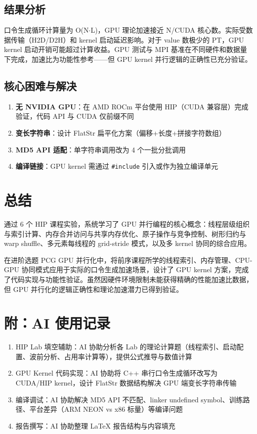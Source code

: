 \documentclass[12pt,a4paper]{article}
\begin{document}
\subsection{结果分析}
口令生成循环计算量为 O(N$\cdot$L)，GPU 理论加速接近 N/CUDA 核心数。实际受数据传输（H2D/D2H）和 kernel 启动延迟影响。对于 value 数极少的 PT，GPU kernel 启动开销可能超过计算收益。GPU 测试与 MPI 基准在不同硬件和数据量下完成，加速比为功能性参考——但 GPU kernel 并行逻辑的正确性已充分验证。

\subsection{核心困难与解决}
\begin{enumerate}[leftmargin=*]
    \item \textbf{无 NVIDIA GPU}：在 AMD ROCm 平台使用 HIP（CUDA 兼容层）完成验证，代码 API 与 CUDA 仅前缀不同
    \item \textbf{变长字符串}：设计 FlatStr 扁平化方案（偏移+长度+拼接字符数组）
    \item \textbf{MD5 API 适配}：单字符串调用改为 4 个一批分批调用
    \item \textbf{编译链接}：GPU kernel 需通过 \texttt{\#include} 引入或作为独立编译单元
\end{enumerate}

\section{总结}

通过 6 个 HIP 课程实验，系统学习了 GPU 并行编程的核心概念：线程层级组织与索引计算、内存合并访问与共享内存优化、原子操作与竞争控制、树形归约与 warp shuffle、多元素每线程的 grid-stride 模式，以及多 kernel 协同的综合应用。

在进阶选题 PCG GPU 并行化中，将前序课程所学的线程索引、内存管理、CPU-GPU 协同模式应用于实际的口令生成加速场景，设计了 GPU kernel 方案，完成了代码实现与功能性验证。虽然因硬件环境限制未能获得精确的性能加速比数据，但 GPU 并行化的逻辑正确性和理论加速潜力已得到验证。

\section*{附：AI 使用记录}

\begin{enumerate}[leftmargin=*]
    \item HIP Lab 填空辅助：AI 协助分析各 Lab 的理论计算题（线程索引、启动配置、波前分析、占用率计算等），提供公式推导与数值计算
    \item GPU Kernel 代码实现：AI 协助将 C++ 串行口令生成循环改写为 CUDA/HIP kernel，设计 FlatStr 数据结构解决 GPU 端变长字符串传输
    \item 编译调试：AI 协助解决 MD5 API 不匹配、linker undefined symbol、训练路径、平台差异（ARM NEON vs x86 标量）等编译问题
    \item 报告撰写：AI 协助整理 LaTeX 报告结构与内容填充
\end{enumerate}
\end{document}
